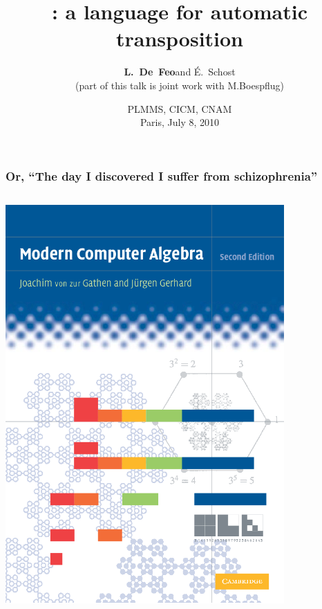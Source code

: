\documentclass[10pt]{beamer}
\title{\tALpy{}: a language for automatic transposition}
\author[\textbf{L. De Feo} and É.~Schost]{\textbf{L.~De~Feo}\footnotemark and É.~Schost\footnotemark\\{\footnotesize(part of this talk is joint work with M.Boespflug\footnotemark[1])}}
\institute[X and UWO]{\footnotemark[1]LIX, École Polytechnique\\\footnotemark[2]SCL, University of Western Ontario}
\date[Paris, July 8, 2010]{PLMMS, CICM, CNAM\\ Paris, July 8, 2010}
\begin{document}
\begin{frame}
  \titlepage
\end{frame}


\begin{frame}
  \frametitle{Or, ``The day I discovered I suffer from schizophrenia''}

  \begin{columns}[c]
    \begin{column}{0.5\textwidth}
      \begin{center}
        \includegraphics[width=0.8\textwidth]{modern.png}



\end{center}
\end{column}
\end{columns}
\end{frame}
\end{document}
